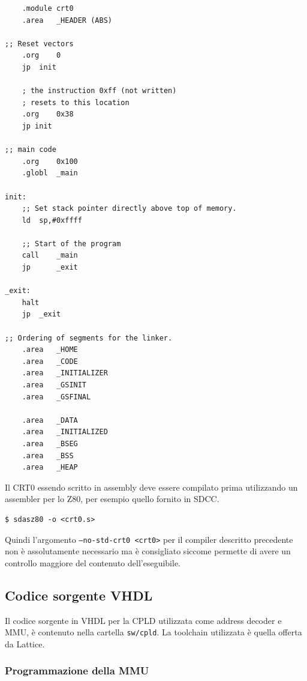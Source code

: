 \documentclass[a4paper, 11pt]{article}
\begin{document}
\lstset{escapechar=@,style=customasm}
\begin{lstlisting}
    .module crt0
    .area   _HEADER (ABS)

;; Reset vectors
    .org    0
    jp  init

    ; the instruction 0xff (not written)
    ; resets to this location
    .org    0x38 
    jp init

;; main code
    .org    0x100
    .globl  _main

init:
    ;; Set stack pointer directly above top of memory.
    ld  sp,#0xffff

    ;; Start of the program
    call    _main
    jp      _exit

_exit:
    halt
    jp  _exit

;; Ordering of segments for the linker.
    .area   _HOME
    .area   _CODE
    .area   _INITIALIZER
    .area   _GSINIT
    .area   _GSFINAL

    .area   _DATA
    .area   _INITIALIZED
    .area   _BSEG
    .area   _BSS
    .area   _HEAP
\end{lstlisting}

Il CRT0 essendo scritto in assembly deve essere compilato prima utilizzando un
assembler per lo Z80, per esempio quello fornito in SDCC.\@
\begin{verbatim}
$ sdasz80 -o <crt0.s>
\end{verbatim}

Quindi l'argomento {\tt --no-std-crt0 <crt0>} per il compiler descritto
precedente non \`e assolutamente necessario ma \`e consigliato siccome permette
di avere un controllo maggiore del contenuto dell'eseguibile.

\subsection{Codice sorgente VHDL}
Il codice sorgente in VHDL per la CPLD utilizzata come address decoder e MMU, 
\`e contenuto nella cartella {\tt sw/cpld}. La toolchain utilizzata \`e quella
offerta da Lattice.

\subsubsection{Programmazione della MMU}


\break
\end{document}
